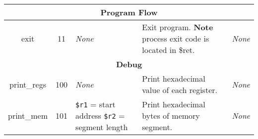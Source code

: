 \documentclass{article}
\begin{document}
\begin{longtable}{|c|c|l|l|l|}
    \multicolumn{5}{|c|}{\textbf{Program Flow}} \\
    \hline
    exit & 11 & \textit{None} & \makecell[l]{Exit program.\\%
    \textbf{Note} process exit code is located in \$ret.} & \textit{None} \\
    \hline \hline
    \multicolumn{5}{|c|}{\textbf{Debug}} \\
    \hline
    print\_regs & 100 & \textit{None} & Print hexadecimal value of each register. & \textit{None} \\
    \hline
    print\_mem & 101 & \makecell[l]{\texttt{\$r1} = start address\\%
    \texttt{\$r2} = segment length} & Print hexadecimal bytes of memory segment. & \textit{None} \\
    \hline
\end{longtable}
\end{document}
